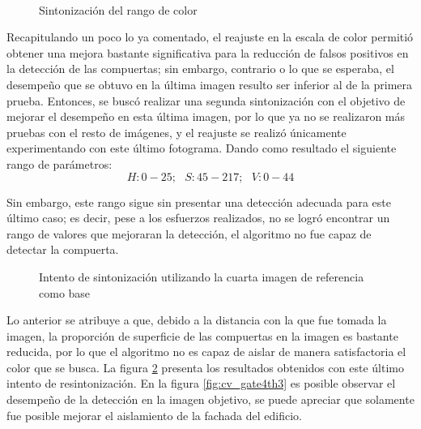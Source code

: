 \begin{figure}[ht]
    \centering
    \hfill
    \\
    \hfill
    \hfill

    \caption{Sintonización del rango de color}
    \label{fig:cv_gatesth2}
\end{figure}

Recapitulando un poco lo ya comentado, el reajuste en la escala de color permitió obtener una mejora bastante significativa para la reducción de falsos positivos en la detección de las compuertas; sin embargo, contrario o lo que se esperaba, el desempeño que se obtuvo en la última imagen resulto ser inferior al de la primera prueba. Entonces, se buscó realizar una segunda sintonización con el objetivo de mejorar el desempeño en esta última imagen, por lo que ya no se realizaron más pruebas con el resto de imágenes, y el reajuste se realizó únicamente experimentando con este último fotograma. Dando como resultado el siguiente rango de parámetros:\[H:0-25;\text{ } S:45-217;\text{ } V:0-44\]

Sin embargo, este rango sigue sin presentar una detección adecuada para este último caso; es decir, pese a los esfuerzos realizados, no se logró encontrar un rango de valores que mejoraran la detección, el algoritmo no fue capaz de detectar la compuerta.

\begin{figure}[ht]
    \centering
    \hfill

    \caption{Intento de sintonización utilizando la cuarta imagen de referencia como base}
    \label{fig:cv_gatesth3}
\end{figure}

Lo anterior se atribuye a que, debido a la distancia con la que fue tomada la imagen, la proporción de superficie de las compuertas en la imagen es bastante reducida, por lo que el algoritmo no es capaz de aislar de manera satisfactoria el color que se busca. La figura \ref{fig:cv_gatesth3} presenta los resultados obtenidos con este último intento de resintonización. En la figura \ref{fig:cv_gate4th3} es posible observar el desempeño de la detección en la imagen objetivo, se puede apreciar que solamente fue posible mejorar el aislamiento de la fachada del edificio.

